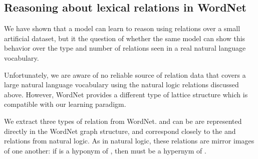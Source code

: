 \subsection*{Reasoning about lexical relations in WordNet}\label{sec:wordnet}


We have shown that a model can learn to reason using relations over a small artificial dataset, 
but it the question of whether the same model can show this behavior over the type and number of
relations seen in a real natural language vocabulary.

Unfortunately, we are aware of no reliable source of relation data that covers a large natural 
language vocabulary using the natural logic relations discussed above. However, WordNet 
\cite{fellbaum2010wordnet} provides a different type of lattice structure which is compatible with
our learning paradigm.

We extract three types of relation from WordNet.  and  can be are represented
directly in the WordNet graph structure, and correspond closely to the \natrev and \natfor relations from
natural logic. As in natural logic, these relations are mirror images of one another: if  is a
hyponym of , then  must be a hypernym of . 





